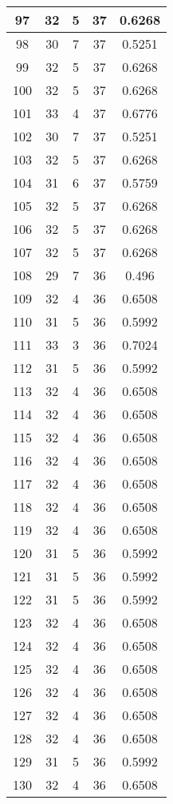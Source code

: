 \documentclass[letterpaper, 12pt]{article}
\begin{document}
\begin{longtable}{|c|c|c|c|c|}
\hline
97 & 32 & 5 & 37 & 0.6268 \\
\hline
98 & 30 & 7 & 37 & 0.5251 \\
\hline
99 & 32 & 5 & 37 & 0.6268 \\
\hline
100 & 32 & 5 & 37 & 0.6268 \\
\hline
101 & 33 & 4 & 37 & 0.6776 \\
\hline
102 & 30 & 7 & 37 & 0.5251 \\
\hline
103 & 32 & 5 & 37 & 0.6268 \\
\hline
104 & 31 & 6 & 37 & 0.5759 \\
\hline
105 & 32 & 5 & 37 & 0.6268 \\
\hline
106 & 32 & 5 & 37 & 0.6268 \\
\hline
107 & 32 & 5 & 37 & 0.6268 \\
\hline
108 & 29 & 7 & 36 & 0.496 \\
\hline
109 & 32 & 4 & 36 & 0.6508 \\
\hline
110 & 31 & 5 & 36 & 0.5992 \\
\hline
111 & 33 & 3 & 36 & 0.7024 \\
\hline
112 & 31 & 5 & 36 & 0.5992 \\
\hline
113 & 32 & 4 & 36 & 0.6508 \\
\hline
114 & 32 & 4 & 36 & 0.6508 \\
\hline
115 & 32 & 4 & 36 & 0.6508 \\
\hline
116 & 32 & 4 & 36 & 0.6508 \\
\hline
117 & 32 & 4 & 36 & 0.6508 \\
\hline
118 & 32 & 4 & 36 & 0.6508 \\
\hline
119 & 32 & 4 & 36 & 0.6508 \\
\hline
120 & 31 & 5 & 36 & 0.5992 \\
\hline
121 & 31 & 5 & 36 & 0.5992 \\
\hline
122 & 31 & 5 & 36 & 0.5992 \\
\hline
123 & 32 & 4 & 36 & 0.6508 \\
\hline
124 & 32 & 4 & 36 & 0.6508 \\
\hline
125 & 32 & 4 & 36 & 0.6508 \\
\hline
126 & 32 & 4 & 36 & 0.6508 \\
\hline
127 & 32 & 4 & 36 & 0.6508 \\
\hline
128 & 32 & 4 & 36 & 0.6508 \\
\hline
129 & 31 & 5 & 36 & 0.5992 \\
\hline
130 & 32 & 4 & 36 & 0.6508 \\

\end{longtable}
\end{document}
